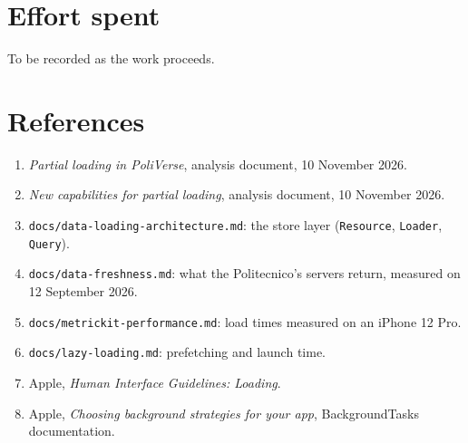 \documentclass[rasd]{se2doc}
\begin{document}
\maketitle






\section{Effort spent}
To be recorded as the work proceeds.

\section{References}
\begin{enumerate}
  \item \emph{Partial loading in PoliVerse}, analysis document, 10 November 2026.
  \item \emph{New capabilities for partial loading}, analysis document, 10 November 2026.
  \item \texttt{docs/data-loading-architecture.md}: the store layer (\texttt{Resource}, \texttt{Loader}, \texttt{Query}).
  \item \texttt{docs/data-freshness.md}: what the Politecnico's servers return, measured on 12 September 2026.
  \item \texttt{docs/metrickit-performance.md}: load times measured on an iPhone 12 Pro.
  \item \texttt{docs/lazy-loading.md}: prefetching and launch time.
  \item Apple, \emph{Human Interface Guidelines: Loading}.
  \item Apple, \emph{Choosing background strategies for your app}, BackgroundTasks documentation.
\end{enumerate}
\end{document}
